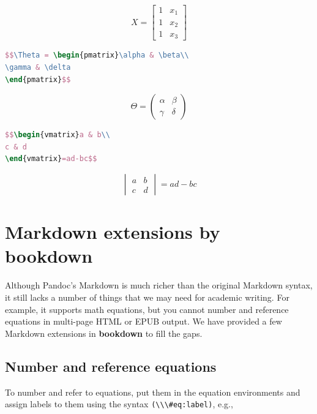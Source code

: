 \documentclass[doctor,openright,twoside]{sjtuthesis}
\newcommand{\passthrough}[1]{#1}
\theoremstyle{plain}
\theoremstyle{definition}
\theoremstyle{remark}
\theoremstyle{ocrenumbox}
\theoremstyle{plain}
\begin{document}
\[X = \begin{bmatrix}1 & x_{1}\\
1 & x_{2}\\
1 & x_{3}
\end{bmatrix}\]

\begin{lstlisting}[language=TeX]
$$\Theta = \begin{pmatrix}\alpha & \beta\\
\gamma & \delta
\end{pmatrix}$$
\end{lstlisting}

\[\Theta = \begin{pmatrix}\alpha & \beta\\
\gamma & \delta
\end{pmatrix}\]

\begin{lstlisting}[language=TeX]
$$\begin{vmatrix}a & b\\
c & d
\end{vmatrix}=ad-bc$$
\end{lstlisting}

\[\begin{vmatrix}a & b\\
c & d
\end{vmatrix}=ad-bc\]

\hypertarget{markdown-extensions-by-bookdown}{%
\section{Markdown extensions by bookdown}\label{markdown-extensions-by-bookdown}}

Although Pandoc's Markdown is much richer than the original Markdown syntax, it still lacks a number of things that we may need for academic writing. For example, it supports math equations, but you cannot number and reference equations in multi-page HTML or EPUB output. We have provided a few Markdown extensions in \textbf{bookdown} to fill the gaps.

\hypertarget{equations}{%
\subsection{Number and reference equations}\label{equations}}

To number and refer to equations, put them in the equation environments and assign labels to them using the syntax \passthrough{\lstinline!(\\\#eq:label)!}, e.g.,
\end{document}
